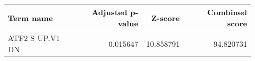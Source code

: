 \begin{tabular}{lrrr}
\toprule
      Term name &  Adjusted p-value &   Z-score &  Combined score \\
\midrule
ATF2 S UP.V1 DN &          0.015647 & 10.858791 &       94.820731 \\
\bottomrule
\end{tabular}
